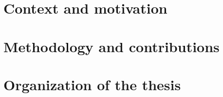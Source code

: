 \section{Context and motivation}
\section{Methodology and contributions}
\section{Organization of the thesis}
